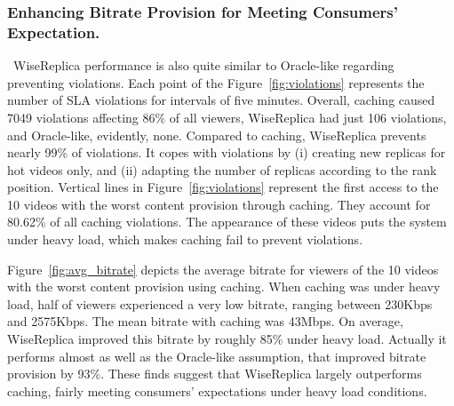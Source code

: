 \subsubsection{Enhancing Bitrate Provision for Meeting Consumers' Expectation.}

\ WiseReplica performance is also quite similar to Oracle-like regarding preventing violations. Each point of the Figure~\ref{fig:violations} represents the number of SLA violations for intervals of five minutes. Overall, caching caused 7049 violations affecting 86\% of all viewers, WiseReplica had just 106 violations, and Oracle-like, evidently, none. Compared to caching, WiseReplica prevents nearly 99\% of violations. It copes with violations by (i) creating new replicas for hot videos only, and (ii) adapting the number of replicas according to the rank position. Vertical lines in Figure~\ref{fig:violations} represent the first access to the 10 videos with the worst content provision through caching. They account for 80.62\% of all caching violations. The appearance of these videos puts the system under heavy load, which makes caching fail to prevent violations.

Figure~\ref{fig:avg_bitrate} depicts the average bitrate for viewers of the 10 videos with the worst content provision using caching. When caching was under heavy load, half of viewers experienced a very low bitrate, ranging between 230Kbps and 2575Kbps. The mean bitrate with caching was 43Mbps. On average, WiseReplica improved this bitrate by roughly 85\% under heavy load. Actually it performs almost as well as the Oracle-like assumption, that improved bitrate provision by 93\%. These finds suggest that WiseReplica largely outperforms caching, fairly meeting consumers' expectations under heavy load conditions.


